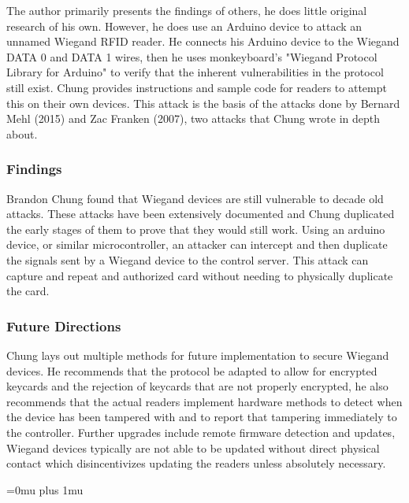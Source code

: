 \noindent
The author primarily presents the findings of others, he does little original research of his own.  However, he does use an Arduino device to attack an unnamed Wiegand RFID reader.  He connects his Arduino device to the Wiegand DATA 0 and DATA 1 wires, then he uses monkeyboard's "Wiegand Protocol Library for Arduino" to verify that the inherent vulnerabilities in the protocol still exist.  Chung provides instructions and sample code for readers to attempt this on their own devices. This attack is the basis of the attacks done by Bernard Mehl (2015) and Zac Franken (2007), two attacks that Chung wrote in depth about.

\subsubsection{Findings}

\noindent
Brandon Chung found that Wiegand devices are still vulnerable to decade old attacks.  These attacks have been extensively documented and Chung duplicated the early stages of them to prove that they would still work.  Using an arduino device, or similar microcontroller, an attacker can intercept and then duplicate the signals sent by a Wiegand device to the control server. This attack can capture and repeat and authorized card without needing to physically duplicate the card.

\subsubsection{Future Directions}

\noindent
Chung lays out multiple methods for future implementation to secure Wiegand devices.  He recommends that the protocol be adapted to allow for encrypted keycards and the rejection of keycards that are not properly encrypted, he also recommends that the actual readers implement hardware methods to detect when the device has been tampered with and to report that tampering immediately to the controller.  Further upgrades include remote firmware detection and updates, Wiegand devices typically are not able to be updated without direct physical contact which disincentivizes updating the readers unless absolutely necessary.

\Urlmuskip=0mu plus 1mu\relax

\pagebreak